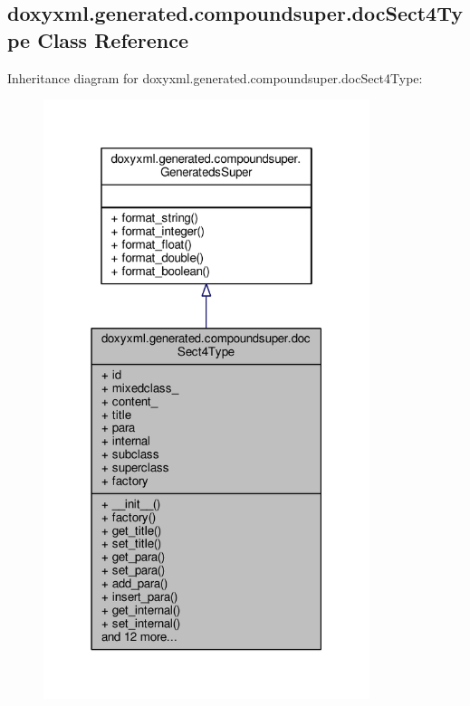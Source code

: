 \subsection{doxyxml.\+generated.\+compoundsuper.\+doc\+Sect4\+Type Class Reference}
\label{classdoxyxml_1_1generated_1_1compoundsuper_1_1docSect4Type}


Inheritance diagram for doxyxml.\+generated.\+compoundsuper.\+doc\+Sect4\+Type\+:
\nopagebreak
\begin{figure}[H]
\begin{center}
\leavevmode
\includegraphics[width=270pt]{d9/d63/classdoxyxml_1_1generated_1_1compoundsuper_1_1docSect4Type__inherit__graph}
\end{center}
\end{figure}


